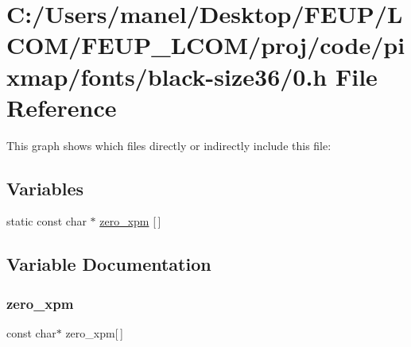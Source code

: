 \hypertarget{black-size36_20_8h}{}\section{C\+:/\+Users/manel/\+Desktop/\+F\+E\+U\+P/\+L\+C\+O\+M/\+F\+E\+U\+P\+\_\+\+L\+C\+O\+M/proj/code/pixmap/fonts/black-\/size36/0.h File Reference}
\label{black-size36_20_8h}
This graph shows which files directly or indirectly include this file\+:
\subsection*{Variables}
\begin{DoxyCompactItemize}
\item 
static const char $\ast$ \mbox{\hyperlink{black-size36_20_8h_a7924628d37db925a0d10786240368f26}{zero\+\_\+xpm}} \mbox{[}$\,$\mbox{]}
\end{DoxyCompactItemize}


\subsection{Variable Documentation}
\mbox{\label{black-size36_20_8h_a7924628d37db925a0d10786240368f26}} 
\subsubsection{\texorpdfstring{zero\_xpm}{zero\_xpm}}
{\footnotesize\ttfamily const char$\ast$ zero\+\_\+xpm\mbox{[}$\,$\mbox{]}\hspace{0.3cm}{\ttfamily [static]}}

